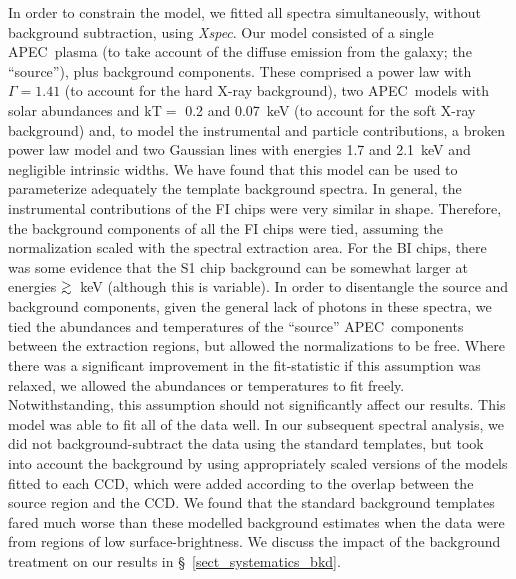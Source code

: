 \documentclass{emulateapj}
\def\spose#1{\hbox to 0pt{#1\hss}}
\def\gtsim{$\mathrel{\spose{\lower 3pt\hbox{$\sim$}} 
        \raise 2.0pt\hbox{$>$}}$\thinspace}
\newcommand{\apec}{APEC}
\newcommand{\xspec }{{\em Xspec}}
\begin{document}
In order to constrain the model, we fitted all
spectra simultaneously, without background subtraction, using \xspec.
Our model  consisted of
a single \apec\ plasma (to take account of the diffuse emission from
the galaxy; the ``source''),
plus background components. These comprised
a power law with $\Gamma=1.41$ (to account for the hard X-ray background),
two \apec\ models with solar abundances and kT$=$ 0.2 and
0.07~keV (to account for the soft X-ray background) and, to model
the instrumental and particle contributions, a broken power law
model and two Gaussian lines with energies 1.7 and 2.1~keV and negligible
intrinsic widths. We have found that this model
can be used to parameterize adequately the template background spectra.
In general, the instrumental contributions of the FI chips were very
similar in shape. Therefore, the background components of all the FI
chips were tied, assuming the normalization scaled with the spectral 
extraction area. For the BI chips, there was some evidence that the 
S1 chip background can be somewhat larger at energies \gtsim 5~keV
(although this is variable).
In order to disentangle the source and background components,
given the general lack of
photons in these spectra, we tied the abundances and
temperatures of the ``source'' \apec\ components between the
extraction regions, but allowed the normalizations to be free.
Where there was a significant improvement in the fit-statistic
if this assumption was relaxed, we allowed the abundances or 
temperatures to fit freely. Notwithstanding, this 
assumption should not significantly affect our results.
This model was able to fit all of the data well.
In our subsequent spectral analysis, we did
not background-subtract the data using the standard templates, but took
into account the background by using appropriately scaled versions
of the models fitted to each CCD, which were added according to the 
overlap between the source region and the CCD. 
We found that the standard background templates fared
much worse than these modelled background estimates when the data
were from regions of low surface-brightness. We discuss the impact of 
the background treatment on our results in \S~\ref{sect_systematics_bkd}.
\end{document}
